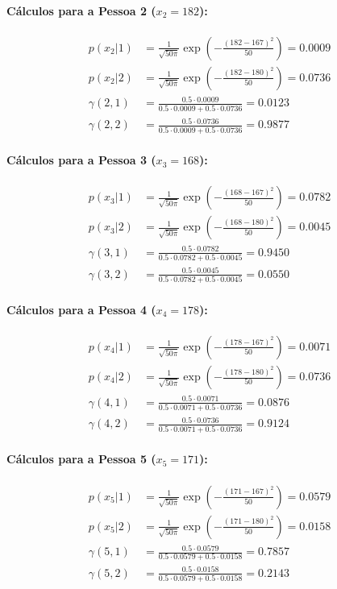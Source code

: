 \documentclass{article}
\begin{document}
\paragraph{Cálculos para a Pessoa 2 ($x_2 = 182$):}
\begin{align*}
p(x_2|1) &= \frac{1}{\sqrt{50\pi}} \exp\left(-\frac{(182-167)^2}{50}\right) = 0.0009 \\
p(x_2|2) &= \frac{1}{\sqrt{50\pi}} \exp\left(-\frac{(182-180)^2}{50}\right) = 0.0736 \\
\gamma(2,1) &= \frac{0.5 \cdot 0.0009}{0.5 \cdot 0.0009 + 0.5 \cdot 0.0736} = 0.0123 \\
\gamma(2,2) &= \frac{0.5 \cdot 0.0736}{0.5 \cdot 0.0009 + 0.5 \cdot 0.0736} = 0.9877
\end{align*}

\paragraph{Cálculos para a Pessoa 3 ($x_3 = 168$):}
\begin{align*}
p(x_3|1) &= \frac{1}{\sqrt{50\pi}} \exp\left(-\frac{(168-167)^2}{50}\right) = 0.0782 \\
p(x_3|2) &= \frac{1}{\sqrt{50\pi}} \exp\left(-\frac{(168-180)^2}{50}\right) = 0.0045 \\
\gamma(3,1) &= \frac{0.5 \cdot 0.0782}{0.5 \cdot 0.0782 + 0.5 \cdot 0.0045} = 0.9450 \\
\gamma(3,2) &= \frac{0.5 \cdot 0.0045}{0.5 \cdot 0.0782 + 0.5 \cdot 0.0045} = 0.0550
\end{align*}

\paragraph{Cálculos para a Pessoa 4 ($x_4 = 178$):}
\begin{align*}
p(x_4|1) &= \frac{1}{\sqrt{50\pi}} \exp\left(-\frac{(178-167)^2}{50}\right) = 0.0071 \\
p(x_4|2) &= \frac{1}{\sqrt{50\pi}} \exp\left(-\frac{(178-180)^2}{50}\right) = 0.0736 \\
\gamma(4,1) &= \frac{0.5 \cdot 0.0071}{0.5 \cdot 0.0071 + 0.5 \cdot 0.0736} = 0.0876 \\
\gamma(4,2) &= \frac{0.5 \cdot 0.0736}{0.5 \cdot 0.0071 + 0.5 \cdot 0.0736} = 0.9124
\end{align*}

\paragraph{Cálculos para a Pessoa 5 ($x_5 = 171$):}
\begin{align*}
p(x_5|1) &= \frac{1}{\sqrt{50\pi}} \exp\left(-\frac{(171-167)^2}{50}\right) = 0.0579 \\
p(x_5|2) &= \frac{1}{\sqrt{50\pi}} \exp\left(-\frac{(171-180)^2}{50}\right) = 0.0158 \\
\gamma(5,1) &= \frac{0.5 \cdot 0.0579}{0.5 \cdot 0.0579 + 0.5 \cdot 0.0158} = 0.7857 \\
\gamma(5,2) &= \frac{0.5 \cdot 0.0158}{0.5 \cdot 0.0579 + 0.5 \cdot 0.0158} = 0.2143
\end{align*}
\end{document}
